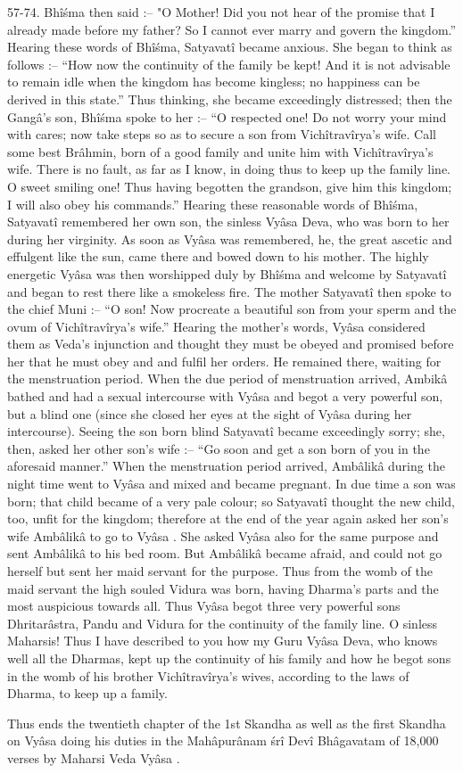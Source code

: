 57-74. Bh\^i\'sma then said :-- "O Mother! Did you not hear of the promise that I already made before my father? So I cannot ever marry and govern the kingdom.'' Hearing these words of Bh\^i\'sma, Satyavat\^i became anxious. She began to think as follows :-- ``How now the continuity of the family be kept! And it is not advisable to remain idle when the kingdom has become kingless; no happiness can be derived in this state.'' Thus thinking, she became exceedingly distressed; then the Gang\^a's son, Bh\^i\'sma spoke to her :-- ``O respected one! Do not worry your mind with cares; now take steps so as to secure a son from Vich\^itrav\^irya's wife. Call some best Br\^ahmin, born of a good family and unite him with Vich\^itrav\^irya's wife. There is no fault, as far as I know, in doing thus to keep up the family line. O sweet smiling one! Thus having begotten the grandson, give him this kingdom; I will also obey his commands.'' Hearing these reasonable words of Bh\^i\'sma, Satyavat\^i remembered her own son, the sinless Vy\^asa  Deva, who was born to her during her virginity. As soon as Vy\^asa was remembered, he, the great ascetic and effulgent like the sun, came there and bowed down to his mother. The highly energetic Vy\^asa was then worshipped duly by Bh\^i\'sma and welcome by Satyavat\^i and began to rest there like a smokeless fire. The mother Satyavat\^i then spoke to the chief Muni :-- ``O son! Now procreate a beautiful son from your sperm and the ovum of Vich\^itrav\^irya's wife.'' Hearing the mother's words, Vy\^asa  considered them as Veda's injunction and thought they must be obeyed and promised before her that he must obey and and fulfil her orders. He remained there, waiting for the menstruation period. When the due period of menstruation arrived, Ambik\^a bathed and had a sexual intercourse with Vy\^asa  and begot a very powerful son, but a blind one (since she closed her eyes at the sight of Vy\^asa  during her intercourse). Seeing the son born blind Satyavat\^i became exceedingly sorry; she, then, asked her other son's wife :-- ``Go soon and get a son born of you in the aforesaid manner.'' When the menstruation period arrived, Amb\^alik\^a during the night time went to Vy\^asa  and mixed and became pregnant. In due time a son was born; that child became of a very pale colour; so Satyavat\^i thought the new child, too, unfit for the kingdom; therefore at the end of the year again asked her son's wife Amb\^alik\^a to go to Vy\^asa . She asked Vy\^asa  also for the same purpose and sent Amb\^alik\^a to his bed room. But Amb\^alik\^a became afraid, and could not go herself but sent her maid servant for the purpose. Thus from the womb of the maid servant the high souled Vidura was born, having Dharma's parts and the most auspicious towards all. Thus Vy\^asa  begot three very powerful sons Dhritar\^astra, Pandu and Vidura for the continuity of the family line. O sinless Maharsis! Thus I have described to you how my Guru Vy\^asa  Deva, who knows well all the Dharmas, kept up the continuity of his family and how he begot sons in the womb of his brother Vich\^itrav\^irya's wives, according to the laws of Dharma, to keep up a family.

Thus ends the twentieth chapter of the 1st Skandha as well as the first Skandha on Vy\^asa  doing his duties in the Mah\^apur\^anam \'sr\^i Dev\^i Bh\^agavatam of 18,000 verses by Maharsi Veda Vy\^asa .

